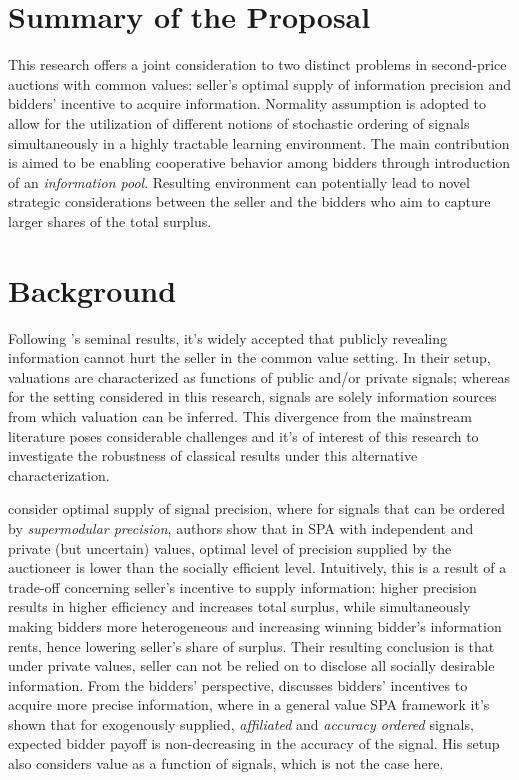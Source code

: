 \section*{Summary of the Proposal}
This research offers a joint consideration to two distinct problems in second-price auctions with common values: seller's optimal supply of information precision and bidders' incentive to acquire information. Normality assumption is adopted to allow for the utilization of different notions of stochastic ordering of signals simultaneously in a highly tractable learning environment. The main contribution is aimed to be enabling cooperative behavior among bidders through introduction of an \textit{information pool}. Resulting environment can potentially lead to novel strategic considerations between the seller and the bidders who aim to capture larger shares of the total surplus.
 

\section*{Background}
Following \cite{milgrom1982theory}'s seminal results, it's widely accepted that publicly revealing information cannot hurt the seller in the common value setting. In their setup, valuations are characterized as functions of public and/or private signals; whereas for the setting considered in this research, signals are solely information sources from which valuation can be inferred. This divergence from the mainstream literature poses considerable challenges and it's of interest of this research to investigate the robustness of classical results under this alternative characterization.

\cite{ganuza2010signal} consider optimal supply of signal precision, where for signals that can be ordered by \textit{supermodular precision}, authors show that in SPA with independent and private (but uncertain) values, optimal level of precision supplied by the auctioneer is lower than the socially efficient level. Intuitively, this is a result of a trade-off concerning seller's incentive to supply information: higher precision results in higher efficiency and increases total surplus, while simultaneously making bidders more heterogeneous and increasing winning bidder's information rents, hence lowering seller's share of surplus. Their resulting conclusion is that under private values, seller can not be relied on to disclose all socially desirable information. From the bidders' perspective, \cite{persico2000information} discusses bidders' incentives to acquire more precise information, where in a general value SPA framework it's shown that for exogenously supplied, \textit{affiliated} and \textit{accuracy ordered} signals, expected bidder payoff is non-decreasing in the accuracy of the signal. His setup also considers value as a function of signals, which is not the case here.

